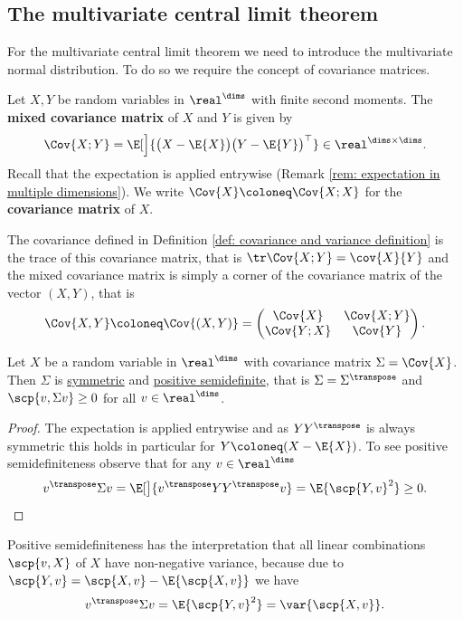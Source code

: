 \subsection{The multivariate central limit theorem}

For the multivariate central limit theorem we need to introduce the multivariate
normal distribution. To do so we require the concept of covariance matrices.

\begin{definition}
    Let \(X, Y\) be random variables in \(\real^\dims\) with finite second moments.
    The \textbf{mixed covariance matrix} of \(X\) and \(Y\) is given by
    \[
        \Cov{X;Y}
        = \E[\Big]{\bigl(X - \E{X}\bigr)\bigl(Y - \E{Y}\bigr)^\top}
        \in \real^{\dims \times \dims}.
    \]
    Recall that the expectation is applied entrywise (Remark \ref{rem: expectation in multiple dimensions}).
    We write \(\Cov{X} \coloneq \Cov{X;X}\) for the \textbf{covariance matrix} of \(X\).
\end{definition}
\begin{remark}
    The covariance defined in Definition \ref{def: covariance and variance
    definition} is the trace of this covariance matrix, that is \(\tr\Cov{X;Y} =
    \cov{X}{Y}\) and the mixed covariance matrix is simply a corner of the
    covariance matrix of the vector \((X,Y)\), that is
    \[
        \Cov{X,Y} \coloneq \Cov{(X,Y)} = \begin{pmatrix}
            \Cov{X} & \Cov{X;Y} \\
            \Cov{Y;X} & \Cov{Y}
        \end{pmatrix}.
    \]
\end{remark}

\begin{lemma}
    \label{lem: covariance matrix psd}
    Let \(X\) be a random variable in \(\real^\dims\) with covariance matrix
    \(\Sigma = \Cov{X}\). Then \(\Sigma\) is \underline{symmetric} and
    \underline{positive semidefinite}, that is \(\Sigma = \Sigma^\transpose\)
    and \(\scp{v, \Sigma v} \ge 0\) for all \(v\in \real^\dims\).
\end{lemma}
\begin{proof}
    The expectation is applied entrywise and as \(Y Y^\transpose\) is always
    symmetric this holds in particular for \(Y\coloneq (X - \E{X})\).
    To see positive semidefiniteness observe that for any \(v\in \real^\dims\)
    \[
        v^\transpose \Sigma v = \E[\big]{v^\transpose Y Y^\transpose v}
        = \E{\scp{Y, v}^2} \ge 0.
        \qedhere
    \]
\end{proof}
\begin{remark}
    Positive semidefiniteness has the interpretation that all linear
    combinations \(\scp{v, X}\) of \(X\) have non-negative variance, because
    due to \(\scp{Y, v} = \scp{X, v} - \E{\scp{X,v}}\) we have
    \[
        v^\transpose \Sigma v
        = \E{\scp{Y, v}^2}
        = \var{\scp{X, v}}.
    \]
\end{remark}

